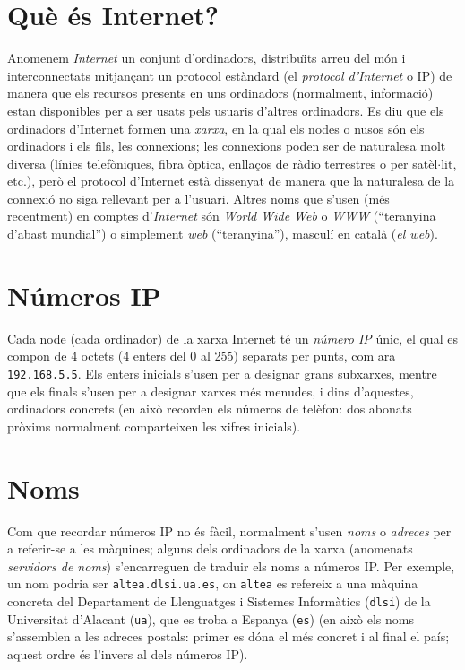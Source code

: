 \section{Què és Internet?}

Anomenem \emph{Internet}  un conjunt d'ordinadors, distribu\"{\i}ts
arreu del món i interconnectats mitjançant un protocol
estàndard (el \emph{protocol d'Internet} o IP) de manera que els recursos
presents en uns ordinadors (normalment, informació) estan
disponibles per a ser usats pels usuaris d'altres ordinadors. Es diu que
els ordinadors d'Internet formen una \emph{xarxa}, en la qual els nodes
o nusos són els ordinadors i els fils, les connexions; les connexions
poden ser de naturalesa molt diversa (línies telefòniques,
fibra òptica, enllaços de ràdio terrestres o per
satèl$\cdot$lit, etc.), però el protocol d'Internet 
està dissenyat de manera que la naturalesa de la connexió no siga
rellevant per a l'usuari. Altres noms que s'usen
(més recentment) en comptes d'\emph{Internet} són \emph{World Wide Web} o
\emph{WWW} (``teranyina d'abast mundial'') o simplement \emph{web}
(``teranyina''), masculí en català (\emph{el web}).

\section{Números IP}
Cada node (cada ordinador) de la xarxa Internet té un {\em
número IP} únic, el qual es compon de 4 octets (4 enters del 0
al 255) separats per punts, com ara {\tt 192.168.5.5}. Els enters
inicials s'usen per a designar grans subxarxes, mentre que els finals
s'usen per a designar xarxes més menudes, i dins d'aquestes, ordinadors
concrets (en això recorden els números de telèfon:
dos abonats pròxims normalment comparteixen les xifres inicials).

\section{Noms}
Com que recordar números IP no és fàcil, normalment s'usen
\emph{noms} o \emph{adreces} per a referir-se a les màquines; alguns
dels ordinadors de la xarxa (anomenats \emph{servidors de noms})
s'encarreguen de traduir els noms a números IP.  Per exemple, un
nom podria ser {\tt altea.dlsi.ua.es}, on {\tt altea} es refereix a
una màquina concreta del Departament de Llenguatges i Sistemes
Informàtics ({\tt dlsi}) de la Universitat d'Alacant ({\tt ua}),
que es troba a Espanya ({\tt es}) (en això els noms s'assemblen a
les adreces postals: primer es dóna el més concret i al final
el país; aquest ordre és l'invers al dels números IP).

